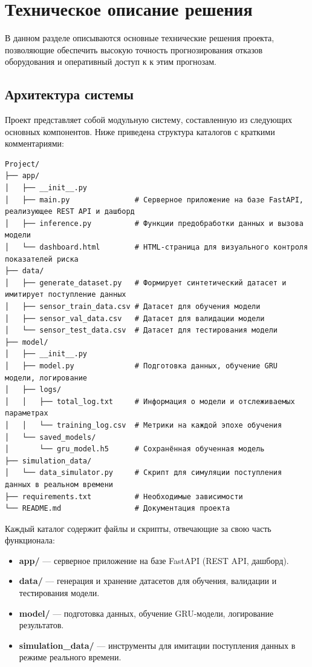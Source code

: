 \documentclass[a4paper,12pt]{article}
\begin{document}
\section{Техническое описание решения}
\begin{flushleft}

В данном разделе описываются основные технические решения проекта, позволяющие обеспечить высокую точность прогнозирования отказов оборудования и оперативный доступ к к этим прогнозам.

\subsection{Архитектура системы}
Проект представляет собой модульную систему, составленную из следующих основных компонентов. Ниже приведена структура каталогов с краткими комментариями:


\begin{lstlisting}
Project/
├── app/
│   ├── __init__.py
│   ├── main.py               # Серверное приложение на базе FastAPI, реализующее REST API и дашборд
│   ├── inference.py          # Функции предобработки данных и вызова модели
│   └── dashboard.html        # HTML-страница для визуального контроля показателей риска
├── data/
│   ├── generate_dataset.py   # Формирует синтетический датасет и имитирует поступление данных
│   ├── sensor_train_data.csv # Датасет для обучения модели
│   ├── sensor_val_data.csv   # Датасет для валидации модели
│   └── sensor_test_data.csv  # Датасет для тестирования модели
├── model/
│   ├── __init__.py
│   ├── model.py              # Подготовка данных, обучение GRU модели, логирование
│   ├── logs/
│   │   ├── total_log.txt     # Информация о модели и отслеживаемых параметрах
│   │   └── training_log.csv  # Метрики на каждой эпохе обучения
│   └── saved_models/
│       └── gru_model.h5      # Сохранённая обученная модель
├── simulation_data/
│   └── data_simulator.py     # Скрипт для симуляции поступления данных в реальном времени
├── requirements.txt          # Необходимые зависимости
└── README.md                 # Документация проекта
\end{lstlisting}

\noindent
Каждый каталог содержит файлы и скрипты, отвечающие за свою часть функционала:
\begin{itemize}
    \item \textbf{app/} --- серверное приложение на базе FastAPI (REST API, дашборд).
    \item \textbf{data/} --- генерация и хранение датасетов для обучения, валидации и тестирования модели.
    \item \textbf{model/} --- подготовка данных, обучение GRU-модели, логирование результатов.
    \item \textbf{simulation\_data/} --- инструменты для имитации поступления данных в режиме реального времени.
\end{itemize}



\end{flushleft}
\end{document}
